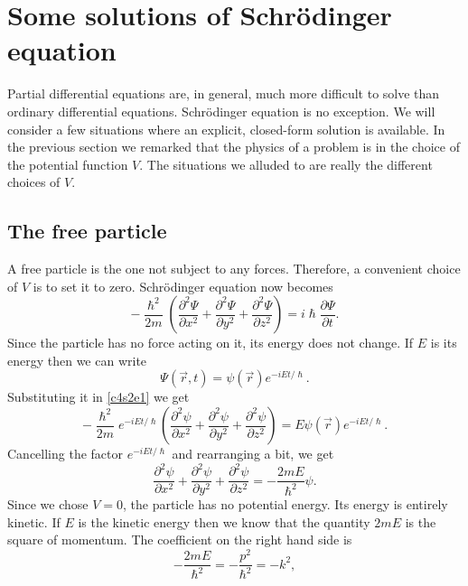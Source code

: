 \section{Some solutions of Schr\"{o}dinger equation}\label{c4s2}
Partial differential equations are, in general, much more difficult to solve 
than ordinary differential equations. Schr\"{o}dinger equation is no exception.
We will consider a few situations where an explicit, closed-form solution is
available. In the previous section we remarked that the physics of a problem
is in the choice of the potential function $V$. The situations we alluded to 
are really the different choices of $V$.

\subsection{The free particle}
A free particle is the one not subject to any forces. Therefore, a convenient
choice of $V$ is to set it to zero. Schr\"{o}dinger equation now becomes
\begin{equation}\label{c4s2e1}
-\frac{\hslash^2}{2m}\left(\frac{\partial^2\Psi}{\partial x^2} + 
\frac{\partial^2\Psi}{\partial y^2} + \frac{\partial^2\Psi}{\partial z^2}
\right) = i\hslash\frac{\partial\Psi}{\partial t}.
\end{equation}
Since the particle has no force acting on it, its energy does not change. If
$E$ is its energy then we can write
\begin{equation}\label{c4s2e2}
\Psi(\vec{r}, t) = \psi(\vec{r})e^{-iEt/\hslash}.
\end{equation}
Substituting it in \eqref{c4s2e1} we get
\begin{equation}\label{c4s2e3}
-\frac{\hslash^2}{2m}e^{-iEt/\hslash}\left(\frac{\partial^2\psi}{\partial x^2} 
+ \frac{\partial^2\psi}{\partial y^2} + \frac{\partial^2\psi}{\partial z^2}
\right) = E\psi(\vec{r})e^{-iEt/\hslash}.
\end{equation}
Cancelling the factor $e^{-iEt/\hslash}$ and rearranging a bit, we get
\begin{equation}\label{c4s2e4}
\frac{\partial^2\psi}{\partial x^2} 
+ \frac{\partial^2\psi}{\partial y^2} + \frac{\partial^2\psi}{\partial z^2} =
-\frac{2mE}{\hslash^2}\psi.
\end{equation}
Since we chose $V = 0$, the particle has no potential energy. Its energy is 
entirely kinetic. If $E$ is the kinetic energy then we know that the quantity
$2mE$ is the square of momentum. The coefficient on the right hand side is
\begin{equation}\label{c4s2e5}
-\frac{2mE}{\hslash^2} = -\frac{p^2}{\hslash^2} = -k^2,
\end{equation}
